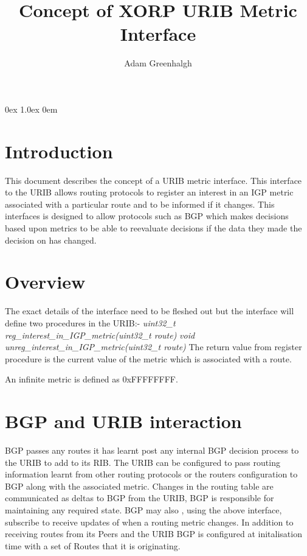 \documentclass[11pt]{article}
\title{Concept of XORP URIB Metric Interface}
\author{Adam Greenhalgh}
\begin{document}
\parsep 0ex
\parskip 1.0ex
\parindent 0em
\noindent
\maketitle                            
\section{Introduction}
This document describes the concept of a URIB metric interface. This interface to the URIB allows routing protocols to register an interest in an IGP metric associated with a particular route and to be informed if it changes. This interfaces is designed to allow protocols such as BGP which makes decisions based upon metrics to be able to reevaluate decisions if the data they made the decision on has changed.
\section{Overview}
The exact details of the interface need to be fleshed out but the interface will define two procedures in the URIB:-
\newline
\newline
{\em uint32\_t reg\_interest\_in\_IGP\_metric(uint32\_t route)}
\newline
{\em void unreg\_interest\_in\_IGP\_metric(uint32\_t route) }
\newline
\newline
The return value from register procedure is the current value of the metric which is associated with a route.

An infinite metric is defined as 0xFFFFFFFF. 

\section{BGP and URIB interaction}
BGP passes any routes it has learnt post any internal BGP decision process to the URIB to add to its RIB. The URIB can be configured to pass routing information learnt from other routing protocols or the routers configuration to BGP along with the associated metric. Changes in the routing table are communicated as deltas to BGP from the URIB, BGP is responsible for maintaining any required state. BGP may also , using the above interface, subscribe to receive updates of when a routing metric changes. In addition to receiving routes from its Peers and the URIB BGP is configured at initalisation time with a set of Routes that it is originating. 
\end{document}

